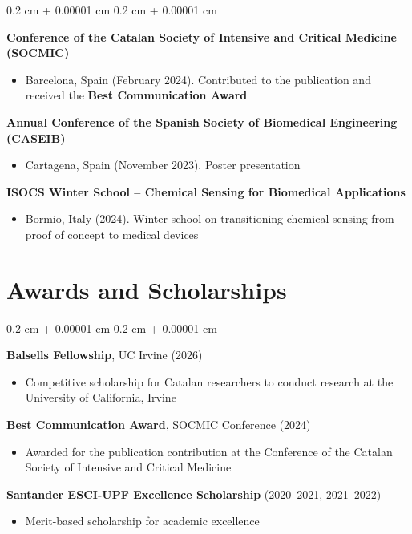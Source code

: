 \documentclass[10pt, letterpaper]{article}
\newenvironment{highlights}{
    \begin{itemize}[
        topsep=0.10 cm,
        parsep=0.10 cm,
        partopsep=0pt,
        itemsep=0pt,
        leftmargin=0.4 cm + 10pt
    ]
}{
    \end{itemize}
} %
\newenvironment{onecolentry}{
    \begin{adjustwidth}{
        0.2 cm + 0.00001 cm
    }{
        0.2 cm + 0.00001 cm
    }
}{
    \end{adjustwidth}
} %
\begin{document}
        \begin{onecolentry}
            \textbf{Conference of the Catalan Society of Intensive and Critical Medicine (SOCMIC)}
            \begin{highlights}
                \item Barcelona, Spain (February 2024). Contributed to the publication and received the \textbf{Best Communication Award}
            \end{highlights}

            \textbf{Annual Conference of the Spanish Society of Biomedical Engineering (CASEIB)}
            \begin{highlights}
                \item Cartagena, Spain (November 2023). Poster presentation
            \end{highlights}

            \textbf{ISOCS Winter School -- Chemical Sensing for Biomedical Applications}
            \begin{highlights}
                \item Bormio, Italy (2024). Winter school on transitioning chemical sensing from proof of concept to medical devices
            \end{highlights}
        \end{onecolentry}


    \section{Awards and Scholarships}

        \begin{onecolentry}
            \textbf{Balsells Fellowship}, UC Irvine (2026)
            \begin{highlights}
                \item Competitive scholarship for Catalan researchers to conduct research at the University of California, Irvine
            \end{highlights}

            \textbf{Best Communication Award}, SOCMIC Conference (2024)
            \begin{highlights}
                \item Awarded for the publication contribution at the Conference of the Catalan Society of Intensive and Critical Medicine
            \end{highlights}

            \textbf{Santander ESCI-UPF Excellence Scholarship} (2020--2021, 2021--2022)
            \begin{highlights}
                \item Merit-based scholarship for academic excellence
            \end{highlights}
        \end{onecolentry}
\end{document}
